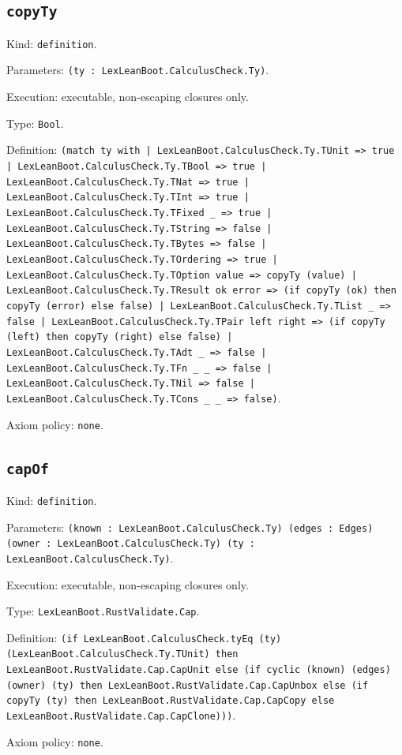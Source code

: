\documentclass[11pt]{article}
\begin{document}
\subsection*{\texttt{copyTy}}
\noindent Kind: \texttt{definition}.\par
\noindent Parameters: \texttt{(ty : LexLeanBoot.CalculusCheck.Ty)}.\par
\noindent Execution: executable, non-escaping closures only.\par
\noindent Type: \texttt{Bool}.\par
\noindent Definition: \texttt{(match ty with | LexLeanBoot.CalculusCheck.Ty.TUnit => true | LexLeanBoot.CalculusCheck.Ty.TBool => true | LexLeanBoot.CalculusCheck.Ty.TNat => true | LexLeanBoot.CalculusCheck.Ty.TInt => true | LexLeanBoot.CalculusCheck.Ty.TFixed \_ => true | LexLeanBoot.CalculusCheck.Ty.TString => false | LexLeanBoot.CalculusCheck.Ty.TBytes => false | LexLeanBoot.CalculusCheck.Ty.TOrdering => true | LexLeanBoot.CalculusCheck.Ty.TOption value => copyTy (value) | LexLeanBoot.CalculusCheck.Ty.TResult ok error => (if copyTy (ok) then copyTy (error) else false) | LexLeanBoot.CalculusCheck.Ty.TList \_ => false | LexLeanBoot.CalculusCheck.Ty.TPair left right => (if copyTy (left) then copyTy (right) else false) | LexLeanBoot.CalculusCheck.Ty.TAdt \_ => false | LexLeanBoot.CalculusCheck.Ty.TFn \_ \_ => false | LexLeanBoot.CalculusCheck.Ty.TNil => false | LexLeanBoot.CalculusCheck.Ty.TCons \_ \_ => false)}.\par
\noindent Axiom policy: \texttt{none}.\par
\subsection*{\texttt{capOf}}
\noindent Kind: \texttt{definition}.\par
\noindent Parameters: \texttt{(known : LexLeanBoot.CalculusCheck.Ty) (edges : Edges) (owner : LexLeanBoot.CalculusCheck.Ty) (ty : LexLeanBoot.CalculusCheck.Ty)}.\par
\noindent Execution: executable, non-escaping closures only.\par
\noindent Type: \texttt{LexLeanBoot.RustValidate.Cap}.\par
\noindent Definition: \texttt{(if LexLeanBoot.CalculusCheck.tyEq (ty) (LexLeanBoot.CalculusCheck.Ty.TUnit) then LexLeanBoot.RustValidate.Cap.CapUnit else (if cyclic (known) (edges) (owner) (ty) then LexLeanBoot.RustValidate.Cap.CapUnbox else (if copyTy (ty) then LexLeanBoot.RustValidate.Cap.CapCopy else LexLeanBoot.RustValidate.Cap.CapClone)))}.\par
\noindent Axiom policy: \texttt{none}.\par
\end{document}
